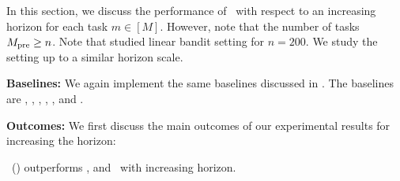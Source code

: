 In this section, we discuss the performance of \pred\ with respect to an increasing horizon for each task $m\in [M]$. However, note that the number of tasks $M_{\text{pre}} \geq n$.
%
%
Note that \citet{lee2023supervised} studied linear bandit setting for $n=200$. We study the setting up to a similar horizon scale.


\textbf{Baselines:} We again implement the same baselines discussed in . The baselines are \pred, \predt, \dptg, \ad, \ts, and \linucb. 


\textbf{Outcomes:} We first discuss the main outcomes of our experimental results for increasing the horizon:

\begin{tcolorbox}
\customfinding \pred\ (\gt) outperforms \dptg, and \ad\ with increasing horizon.
\end{tcolorbox}









